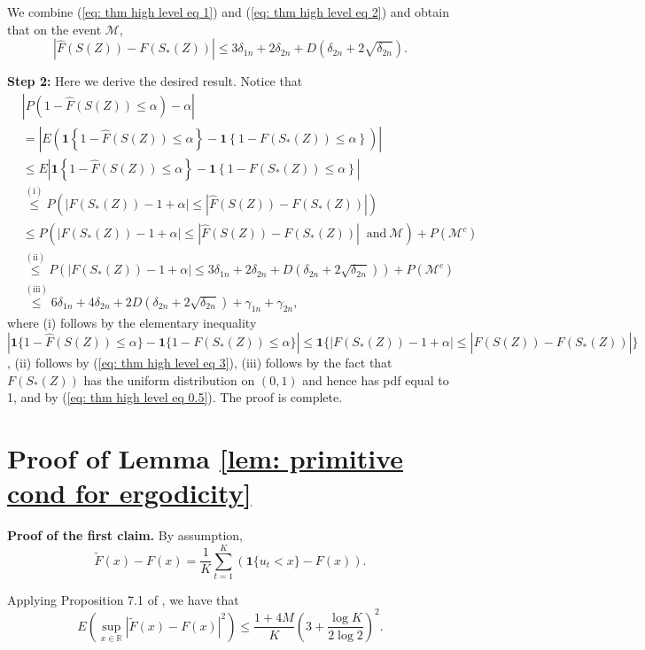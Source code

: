 \documentclass[final,12pt]{colt2018} %
\begin{document}
We combine (\ref{eq: thm high level eq 1}) and (\ref{eq: thm high level eq 2})
and obtain that on the event $\mathcal{M}$, 
\begin{equation}
\left|\hat{F}(S(Z))-F(S_*(Z))\right|\leq
3\delta_{1n}+ 2 \delta_{2n}+ D(\delta_{2n}+2 \sqrt{\delta_{2n}}).\label{eq: thm high level eq 3}
\end{equation}

\textbf{Step 2:} Here we derive the desired result. Notice that 
\begin{align*}
& \left|P\left(1-\hat{F}(S(Z))\leq\alpha\right)-\alpha\right|\\
 &  =\left|E\left(\mathbf{1}\left\{ 1-\hat{F}(S(Z))\leq\alpha\right\} -\mathbf{1}\left\{ 1-F(S_*(Z))\leq\alpha\right\} \right)\right|\\
 & \leq E\left|\mathbf{1}\left\{ 1-\hat{F}(S(Z))\leq\alpha\right\} -\mathbf{1}\left\{ 1-F(S_*(Z))\leq\alpha\right\} \right|\\
 & \overset{\mathrm{(i)}}{\leq}P\left(\left|F(S_*(Z))-1+\alpha\right|\leq\left|\hat{F}(S(Z))-F(S_*(Z))\right|\right)\\
 & \leq P\left(\left|F(S_*(Z))-1+\alpha\right|\leq\left|\hat{F}(S(Z))-F(S_*(Z))\right|\ \text{ and}\ \mathcal{M}\right)+P(\mathcal{M}^{c})\\
 & \overset{\mathrm{(ii)}}{\leq}P\left(\left|F(S_*(Z))-1+\alpha\right|\leq
  3\delta_{1n}+ 2 \delta_{2n}+ D(\delta_{2n}+ 2\sqrt{\delta_{2n}})\right)+P\left(\mathcal{M}^{c}\right)\\
 & \overset{\mathrm{(iii)}}{\leq}
6\delta_{1n}+ 4 \delta_{2n}+ 2 D(\delta_{2n}+ 2\sqrt{\delta_{2n}}) +\gamma_{1n}+\gamma_{2n},
\end{align*}
where (i) follows by the elementary inequality $|\mathbf{1}\{1-\hat{F}(S(Z))\leq\alpha\}-\mathbf{1}\{1-F(S_*(Z))\leq\alpha\}|\leq\mathbf{1}\{|F(S_*(Z))-1+\alpha|\leq|\hat{F}(S(Z))-F(S_*(Z))|\}$,
(ii) follows by (\ref{eq: thm high level eq 3}), (iii) follows
by the fact that $F(S_*(Z))$ has the uniform distribution on $(0,1)$
and hence has pdf equal to 1, and  by (\ref{eq: thm high level eq 0.5}).
The proof is complete. 


\section{Proof of Lemma \ref{lem: primitive cond for ergodicity}}
\textbf{Proof of the first claim.} By assumption, 
\[
\tilde{F}(x)-F(x)=\frac{1}{K}\sum_{t=1}^{K}\left(\mathbf{1}\{u_{t}<x\}-F(x)\right).
\]

Applying Proposition 7.1 of  \cite{rio2017asymptotic}, we have that 
\[
E\left(\sup_{x\in\mathbb{R}}\left|\tilde{F}(x)-F(x)\right|^{2}\right)\leq\frac{1+4M}{K}\left(3+\frac{\log K}{2\log2}\right)^{2}.
\]
\end{document}
